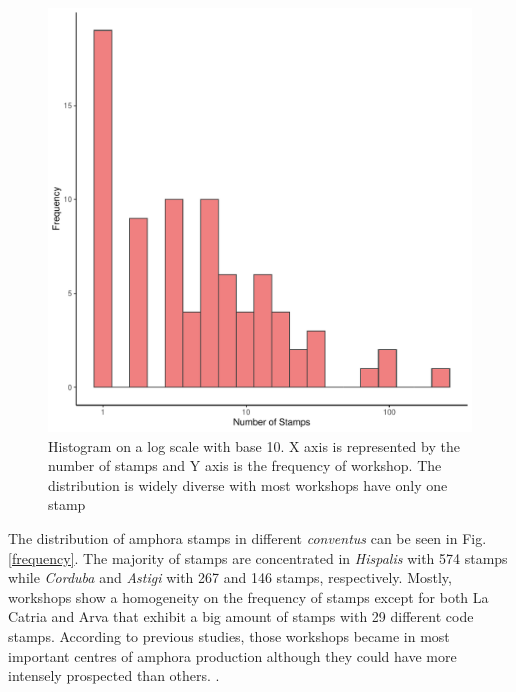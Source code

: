 \documentclass[review]{elsarticle}
\newcommand{\memo}[2]{\textcolor{#1}{#2}}
\newcommand{\xavi}[1]{\memo{magenta}{XRC: #1\\}}
\begin{document}
\begin{figure}[htp]
	\centering
\includegraphics[width=\linewidth]{figs/frequencystamp.pdf}
\caption{Histogram on a log scale with base 10. X axis is represented by the number of stamps and Y axis is the frequency of workshop. The distribution is widely diverse with most workshops have only one stamp}
\label{stamps}
\end{figure} 



The distribution of amphora stamps in different \textit{conventus} can be seen in Fig. \ref{frequency}. The majority of stamps are concentrated in \textit{Hispalis} with 574 stamps while \textit{Corduba} and \textit{Astigi} with 267 and 146 stamps, respectively. Mostly, workshops show a homogeneity on the frequency of stamps except for both La Catria and Arva that exhibit a big amount of stamps with 29 different code stamps. According to previous studies, those workshops became in most important centres of amphora production although they could have more intensely prospected than others. \citep{arva_1997}.
 
\end{document}
